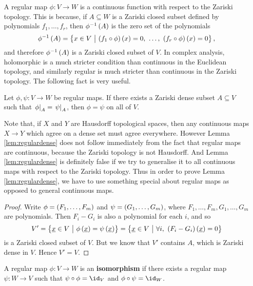 A regular map $ \phi : V \to W $ is a continuous function with respect to the Zariski topology. This is because, if $ A \subseteq W $ is a Zariski closed subset defined by polynomials $ f_1, \dots, f_r $, then $ \phi^{-1}\br{A} $ is the zero set of the polynomials
$$ \phi^{-1}\br{A} = \cbr{x \in V \st \br{f_1 \circ \phi}\br{x} = 0, \ \dots, \ \br{f_r \circ \phi}\br{x} = 0}, $$
and therefore $ \phi^{-1}\br{A} $ is a Zariski closed subset of $ V $. In complex analysis, holomorphic is a much stricter condition than continuous in the Euclidean topology, and similarly regular is much stricter than continuous in the Zariski topology. The following fact is very useful.

\begin{lemma}
\label{lem:regulardense}
Let $ \phi, \psi : V \to W $ be regular maps. If there exists a Zariski dense subset $ A \subseteq V $ such that $ \left. \phi \right|_A = \left. \psi \right|_A $, then $ \phi = \psi $ on all of $ V $.
\end{lemma}

Note that, if $ X $ and $ Y $ are Hausdorff topological spaces, then any continuous maps $ X \to Y $ which agree on a dense set must agree everywhere. However Lemma \ref{lem:regulardense} does not follow immediately from the fact that regular maps are continuous, because the Zariski topology is not Hausdorff. And Lemma \ref{lem:regulardense} is definitely false if we try to generalise it to all continuous maps with respect to the Zariski topology. Thus in order to prove Lemma \ref{lem:regulardense}, we have to use something special about regular maps as opposed to general continuous maps.

\begin{proof}
Write $ \phi = \br{F_1, \dots, F_m} $ and $ \psi = \br{G_1, \dots, G_m} $, where $ F_1, \dots, F_m, G_1, \dots, G_m $ are polynomials. Then $ F_i - G_i $ is also a polynomial for each $ i $, and so
$$ V' = \cbr{\underline{x} \in V \st \phi\br{\underline{x}} = \psi\br{\underline{x}}} = \cbr{\underline{x} \in V \st \forall i, \ \br{F_i - G_i}\br{\underline{x}} = 0} $$
is a Zariski closed subset of $ V $. But we know that $ V' $ contains $ A $, which is Zariski dense in $ V $. Hence $ V' = V $.
\end{proof}


\begin{definition*}
A regular map $ \phi : V \to W $ is an \textbf{isomorphism} if there exists a regular map $ \psi : W \to V $ such that $ \psi \circ \phi = \id_V $ and $ \phi \circ \psi = \id_W $.
\end{definition*}

